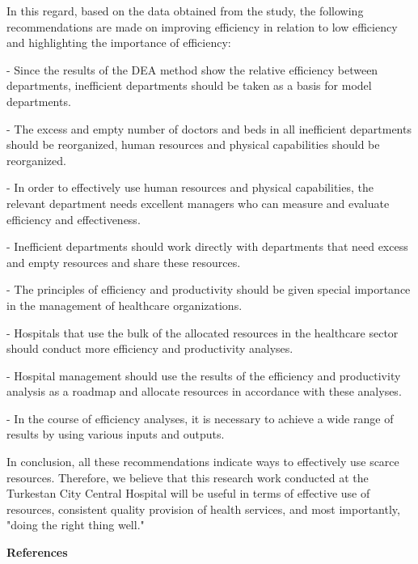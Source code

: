 \begin{multicols}{2}
In this regard, based on the data obtained from the study, the following
recommendations are made on improving efficiency in relation to low
efficiency and highlighting the importance of efficiency:

- Since the results of the DEA method show the relative efficiency
between departments, inefficient departments should be taken as a basis
for model departments.

- The excess and empty number of doctors and beds in all inefficient
departments should be reorganized, human resources and physical
capabilities should be reorganized.

- In order to effectively use human resources and physical capabilities,
the relevant department needs excellent managers who can measure and
evaluate efficiency and effectiveness.

- Inefficient departments should work directly with departments that
need excess and empty resources and share these resources.

- The principles of efficiency and productivity should be given special
importance in the management of healthcare organizations.

- Hospitals that use the bulk of the allocated resources in the
healthcare sector should conduct more efficiency and productivity
analyses.

- Hospital management should use the results of the efficiency and
productivity analysis as a roadmap and allocate resources in accordance
with these analyses.

- In the course of efficiency analyses, it is necessary to achieve a
wide range of results by using various inputs and outputs.

In conclusion, all these recommendations indicate ways to effectively
use scarce resources. Therefore, we believe that this research work
conducted at the Turkestan City Central Hospital will be useful in terms
of effective use of resources, consistent quality provision of health
services, and most importantly, "doing the right thing well."
\end{multicols}

\begin{center}
{\bfseries References}
\end{center}

